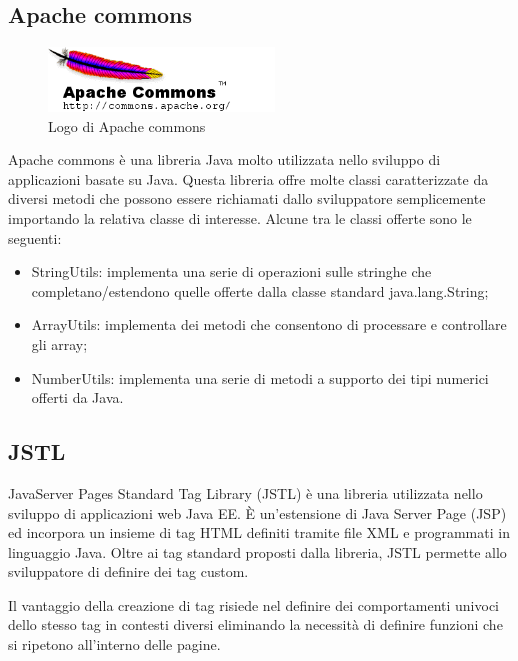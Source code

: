 \subsection{Apache commons}

\begin{figure}[!h]
	\centering
	\includegraphics[width=6cm]{../images/Commons-logo.png}
	\caption{Logo di Apache commons}
\end{figure}

\noindent Apache commons è una libreria Java molto utilizzata nello sviluppo di applicazioni basate su Java. Questa libreria offre molte classi caratterizzate da diversi metodi che possono essere richiamati dallo sviluppatore semplicemente importando la relativa classe di interesse. Alcune tra le classi offerte sono le seguenti:
\begin{itemize}
\item StringUtils: implementa una serie di operazioni sulle stringhe che completano/estendono quelle offerte dalla classe standard java.lang.String;
\item ArrayUtils: implementa dei metodi che consentono di processare e controllare gli array; 
\item NumberUtils: implementa una serie di metodi a supporto dei tipi numerici offerti da Java.
\end{itemize} 

\subsection{JSTL}
\noindent JavaServer Pages Standard Tag Library (JSTL) è una libreria utilizzata nello sviluppo di applicazioni web Java EE. È un'estensione di Java Server Page (JSP) ed incorpora un insieme di tag HTML definiti tramite file XML e programmati in linguaggio Java. Oltre ai tag standard proposti dalla libreria, JSTL permette allo sviluppatore di definire dei tag custom. 

\setlength{\parskip}{3ex}

\noindent Il vantaggio della creazione di tag risiede nel definire dei comportamenti univoci dello stesso tag in contesti diversi eliminando la necessità di definire funzioni che si ripetono all'interno delle pagine.

\pagebreak


